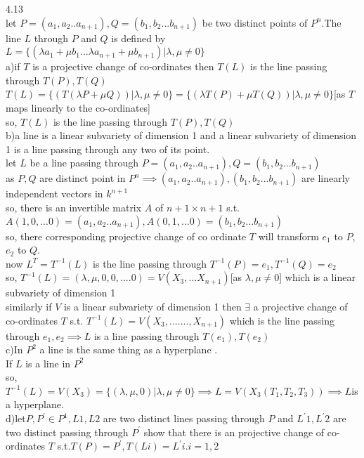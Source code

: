 \documentclass[11pt]{amsart}
\theoremstyle{definition}
\begin{document}
4.13\\
let $P=(a_1,a_2..a_{n+1}),Q=(b_1,b_2...b_{n+1})$ be two distinct points of $P^n$.The line $L$ through $P$ and $Q$ is defined by $L=\{(\lambda a_1+\mu b_1...\lambda a_{n+1}+\mu b_{n+1})|\lambda,\mu \neq 0\}$\\
a)if $T$ is a projective change of co-ordinates then $T(L)$ is the line passing through $T(P),T(Q)$\\
$T(L)=\{(T(\lambda P+\mu Q))|\lambda,\mu \neq 0\}=\{(\lambda T(P)+\mu T(Q))|\lambda,\mu \neq 0\}$[as $T$ maps linearly to the co-ordinates]\\
so, $T(L)$ is  the line passing through $T(P),T(Q)$\\ 
b)a line is a linear subvariety of dimension 1 and a linear subvariety of dimension 1 is a line passing through any two of its point.\\
let $L$ be a line passing through $P=(a_1,a_2..a_{n+1}),Q=(b_1,b_2...b_{n+1})$\\
 as $P,Q$ are distinct point in $P^n\implies (a_1,a_2..a_{n+1}),(b_1,b_2...b_{n+1})$ are linearly independent vectors in $k^{n+1}$\\
 so, there is an invertible matrix $A$ of $n+1\times n+1$ s.t. $A(1,0,...0)=(a_1,a_2..a_{n+1}),A(0,1,...0)=(b_1,b_2...b_{n+1})$\\
 so, there corresponding projective change of co ordinate $T$ will transform $e_1$ to $P$, $e_2$ to $Q$.\\
 now $ L^{T}=T^{-1}(L)$ is the line passing through $T^{-1}(P)=e_1,T^{-1}(Q)=e_2$\\
 so, $T^{-1}(L)=(\lambda,\mu,0,0,....0)=V(X_3,...X_{n+1})$[as $\lambda,\mu\neq 0$] which is a linear subvariety of dimension 1\\
 similarly if $V$ is a linear subvariety of dimension 1 then $\exists$ a projective change of co-ordinates $T$ s.t. $T^{-1}(L)=V(X_3,.......,X_{n+1})$ which is the line passing through $e_1,e_2\implies L$ is a line passing through $T(e_1),T(e_2)$\\
 c)In $P^2$ a line is the same thing as a hyperplane .\\
If $L$ is a line in $P^2$\\
so, $T^{-1}(L)=V(X_3)=\{(\lambda,\mu,0)|\lambda,\mu\neq 0\}\implies L=V(X_3(T_1,T_2,T_3))\implies L$is a hyperplane.\\
d)let$P, P^{'} \in P^1,L1,L2$ are two distinct lines passing through $P$ and $L^{'}1,L^{'}2$ are two distinct passing through $P^{'}$ show that there is an projective change of co-ordinates $T$ s.t.$T(P)=P^{'},T(Li)=L^{'}i.i=1,2$\\\\
\end{document}

